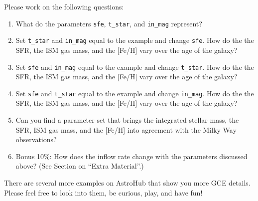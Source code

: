 \documentclass[letterpaper,12pt,twoside=false,DIV=11]{scrartcl}
\begin{document}
Please work on the following questions:
\begin{enumerate}
    \item What do the parameters \texttt{sfe}, \texttt{t\_star}, and \texttt{in\_mag} represent?
    \item Set \texttt{t\_star} and \texttt{in\_mag} equal to the example and change \texttt{sfe}. How do the the SFR, the ISM gas mass, and the [Fe/H] vary over the age of the galaxy?
    \item Set \texttt{sfe} and \texttt{in\_mag} equal to the example and change \texttt{t\_star}. How do the the SFR, the ISM gas mass, and the [Fe/H] vary over the age of the galaxy?
    \item Set \texttt{sfe} and \texttt{t\_star} equal to the example and change \texttt{in\_mag}. How do the the SFR, the ISM gas mass, and the [Fe/H] vary over the age of the galaxy?
    \item Can you find a parameter set that brings the integrated stellar mass, the SFR, ISM gas mass, and the [Fe/H] into agreement with the Milky Way observations?
    \item Bonus 10\%: How does the inflow rate change with the parameters discussed above? (See Section on ``Extra Material''.)
\end{enumerate}

There are several more examples on AstroHub that show you more GCE details. Please feel free to look into them, be curious, play, and have fun!
\end{document}
